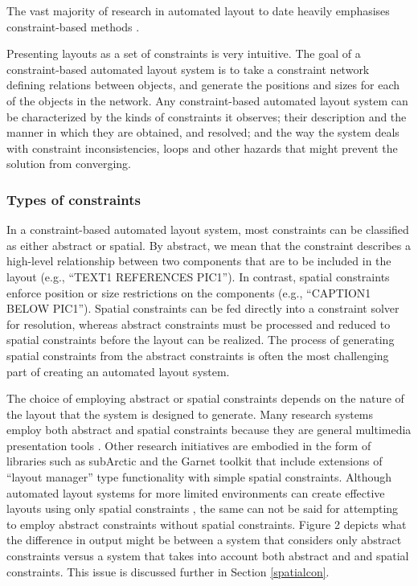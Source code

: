     The vast majority of research in automated layout to date heavily emphasises
    constraint-based methods
    \citep{vanderzanden-1,borning-1,graf-1,hudson-3,kochhar-1,hudson-2,weitzman-2,myers-2}.

    Presenting layouts as a set of constraints is very intuitive. The goal of a
    constraint-based automated layout system is to take a constraint network
    defining relations between objects, and generate the positions and sizes
    for each of the objects in the network. Any constraint-based automated
    layout system can be characterized by the kinds of constraints it observes;
    their description and the manner in which they are obtained, and resolved;
    and the way the system deals with constraint inconsistencies, loops and
    other hazards that might prevent the solution from converging.

    \subsubsection{Types of constraints}

     In a constraint-based automated layout system, most constraints can be
     classified as either abstract or spatial. By abstract, we mean that the
     constraint describes a high-level relationship between two components that
     are to be included in the layout (e.g., “TEXT1 REFERENCES PIC1”). In
     contrast, spatial constraints enforce position or size restrictions on the
     components (e.g., “CAPTION1 BELOW PIC1”). Spatial constraints can be fed
     directly into a constraint solver for resolution, whereas abstract
     constraints must be processed and reduced to spatial constraints before the
     layout can be realized. The process of generating spatial constraints from
     the abstract constraints is often the most challenging part of creating an
     automated layout system.

     The choice of employing abstract or spatial constraints depends on the
     nature of the layout that the system is designed to generate. Many research
     systems employ both abstract and spatial constraints because they are
     general multimedia presentation tools \citep{feiner-1,weitzman-2,graf-1}.
     Other research initiatives are embodied in the form of libraries such as
     subArctic \citep{hudson-3,hudson-1} and the Garnet toolkit \citep{myers-2}
     that include extensions of “layout manager” type functionality with simple
     spatial constraints. Although automated layout systems for more limited
     environments can create effective layouts using only spatial constraints
     \citep{kosak-1}, the same can not be said for attempting to employ abstract
     constraints without spatial constraints. Figure 2 depicts what the
     difference in output might be between a system that considers only abstract
     constraints versus a system that takes into account both abstract and and
     spatial constraints. This issue is discussed further in Section
     \ref{spatialcon}.

